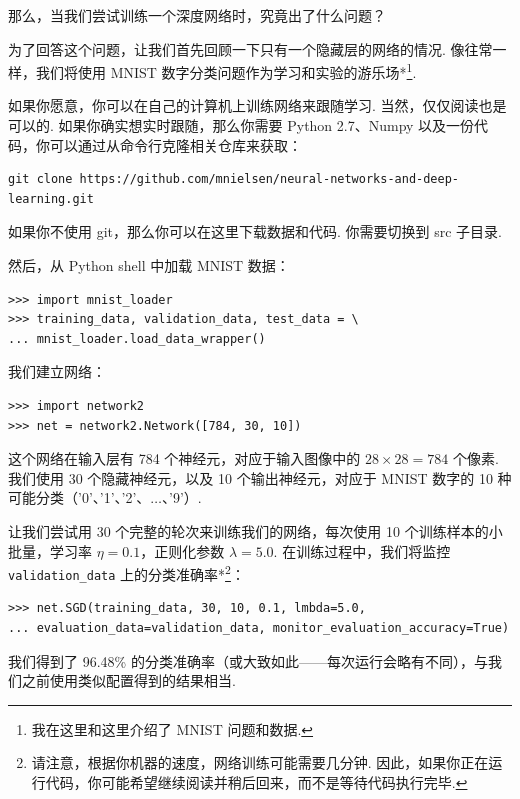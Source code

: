 那么，当我们尝试训练一个深度网络时，究竟出了什么问题？

为了回答这个问题，让我们首先回顾一下只有一个隐藏层的网络的情况. 像往常一样，我们将使用 MNIST 数字分类问题作为学习和实验的游乐场*\footnote{我在这里和这里介绍了 MNIST 问题和数据.}.

如果你愿意，你可以在自己的计算机上训练网络来跟随学习. 当然，仅仅阅读也是可以的. 如果你确实想实时跟随，那么你需要 Python 2.7、Numpy 以及一份代码，你可以通过从命令行克隆相关仓库来获取：

\begin{lstlisting}
git clone https://github.com/mnielsen/neural-networks-and-deep-learning.git

\end{lstlisting}

如果你不使用 git，那么你可以在这里下载数据和代码. 你需要切换到 src 子目录.

然后，从 Python shell 中加载 MNIST 数据：

\begin{lstlisting}
>>> import mnist_loader
>>> training_data, validation_data, test_data = \
... mnist_loader.load_data_wrapper()

\end{lstlisting}

我们建立网络：

\begin{lstlisting}
>>> import network2
>>> net = network2.Network([784, 30, 10])

\end{lstlisting}

这个网络在输入层有 784 个神经元，对应于输入图像中的 $28 \times 28 = 784$ 个像素. 我们使用 30 个隐藏神经元，以及 10 个输出神经元，对应于 MNIST 数字的 10 种可能分类（'0'、'1'、'2'、$\ldots$、'9'）.

让我们尝试用 30 个完整的轮次来训练我们的网络，每次使用 10 个训练样本的小批量，学习率 $\eta = 0.1$，正则化参数 $\lambda = 5.0$. 在训练过程中，我们将监控 \texttt{validation\_\allowbreak{}data} 上的分类准确率*\footnote{请注意，根据你机器的速度，网络训练可能需要几分钟. 因此，如果你正在运行代码，你可能希望继续阅读并稍后回来，而不是等待代码执行完毕.}：

\begin{lstlisting}
>>> net.SGD(training_data, 30, 10, 0.1, lmbda=5.0,
... evaluation_data=validation_data, monitor_evaluation_accuracy=True)

\end{lstlisting}

我们得到了 96.48\% 的分类准确率（或大致如此——每次运行会略有不同），与我们之前使用类似配置得到的结果相当.

